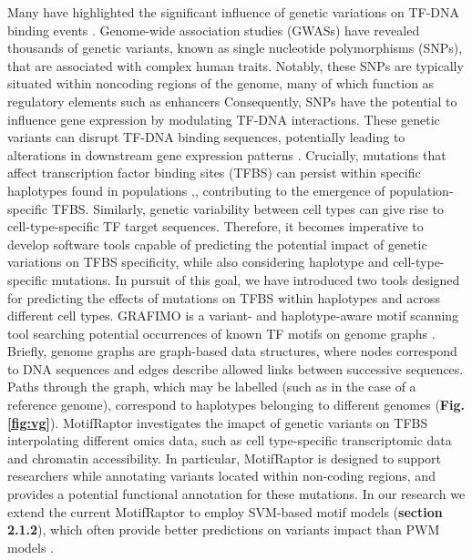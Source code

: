 \documentclass[a4paper, titlepage, openright]{book}
\newcommand{\grafimo}{GRAFIMO\xspace}
\newcommand{\motifraptor}{MotifRaptor\xspace}
\begin{document}
Many have highlighted the significant influence of genetic variations on TF-DNA binding events \citep{de2006regulatory, weinhold2014genome, guo2018mutation}. Genome-wide association studies (GWASs) have revealed thousands of genetic variants, known as single nucleotide polymorphisms (SNPs), that are associated with complex human traits. Notably, these SNPs are typically situated within noncoding regions of the genome, many of which function as regulatory elements such as enhancers \citep{maurano2012systematic} Consequently, SNPs have the potential to influence gene expression by modulating TF-DNA interactions. These genetic variants can disrupt TF-DNA binding sequences, potentially leading to alterations in downstream gene expression patterns \citep{deplancke2016genetics}. Crucially, mutations that affect transcription factor binding sites (TFBS) can persist within specific haplotypes found in populations \citep{kasowski2010variation},, contributing to the emergence of population-specific TFBS. Similarly, genetic variability between cell types can give rise to cell-type-specific TF target sequences. Therefore, it becomes imperative to develop software tools capable of predicting the potential impact of genetic variations on TFBS specificity, while also considering haplotype and cell-type-specific mutations.  In pursuit of this goal, we have introduced two tools designed for predicting the effects of mutations on TFBS within haplotypes and across different cell types. \grafimo \citep{tognon2021grafimo} is a variant- and haplotype-aware motif scanning tool searching potential occurrences of known TF motifs on genome graphs \citep{paten2017genome}. Briefly, genome graphs are graph-based data structures, where nodes correspond to DNA sequences and edges describe allowed links between successive sequences. Paths through the graph, which may be labelled (such as in the case of a reference genome), correspond to haplotypes belonging to different genomes \citep{siren2020haplotype} (\textbf{Fig.\ref{fig:vg}}). \motifraptor \citep{yao2021motif} investigates the imapct of genetic variants on TFBS interpolating different omics data, such as cell type-specific transcriptomic data and chromatin accessibility. In particular, \motifraptor is designed to support researchers while annotating variants located within non-coding regions, and provides a potential functional annotation for these mutations. In our research we extend the current \motifraptor to employ SVM-based motif models (\textbf{section 2.1.2}), which often provide better predictions on variants impact than PWM models \citep{tognon2023survey}.
\end{document}
